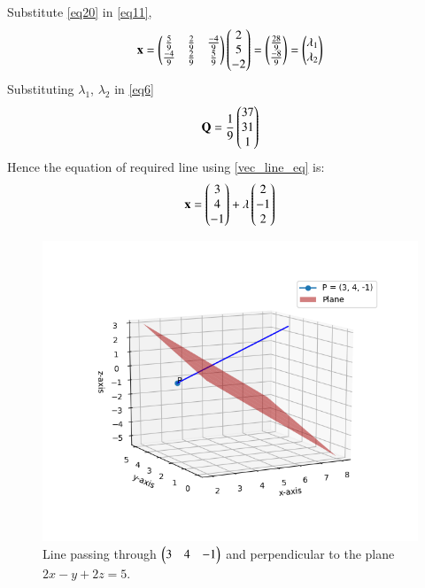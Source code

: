 \documentclass[journal,12pt,twocolumn]{IEEEtran}
\begin{document}
Substitute \eqref{eq20} in \eqref{eq11},
\begin{align}\label{23}
	\mathbf{x} =\begin{pmatrix}\frac{5}{9} & \frac{2}{9} & \frac{-4}{9} \\ \frac{-4}{9} & \frac{2}{9} & \frac{5}{9}\end{pmatrix}\begin{pmatrix}2\\5\\-2\end{pmatrix} = \begin{pmatrix}\frac{28}{9}\\\frac{-8}{9}\end{pmatrix} = \begin{pmatrix}\lambda_1 \\ \lambda_2\end{pmatrix}
\end{align}
Substituting $\lambda_1$, $\lambda_2$ in \eqref{eq6}
\begin{equation}
	\mathbf{Q} = \frac{1}{9}\begin{pmatrix}37\\31\\1\end{pmatrix}
\end{equation}
Hence the equation of required line using \eqref{vec_line_eq} is:
\begin{align}
     \mathbf{x} = \begin{pmatrix}3\\4\\-1\end{pmatrix} +\lambda\begin{pmatrix}2\\-1\\2\end{pmatrix} 
\end{align}
\begin{figure}[h]
    \centering
    \includegraphics[width = \columnwidth]{assignment_8.png}
    \caption{Line passing through $\begin{pmatrix}3 & 4 & -1\end{pmatrix}$ and perpendicular to the plane $2x - y + 2z = 5$.}
    \label{line and plane}
\end{figure}
\end{document}
